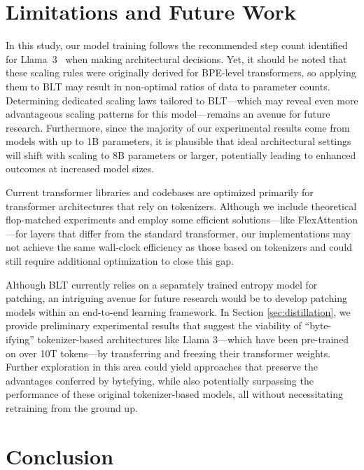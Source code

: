 \section{Limitations and Future Work}

In this study, our model training follows the recommended step count identified for Llama~3~\citep{dubey2024llama} when making architectural decisions. Yet, it should be noted that these scaling rules were originally derived for BPE-level transformers, so applying them to {\textsc BLT} may result in non-optimal ratios of data to parameter counts. Determining dedicated scaling laws tailored to {\textsc BLT}—which may reveal even more advantageous scaling patterns for this model—remains an avenue for future research. Furthermore, since the majority of our experimental results come from models with up to 1B parameters, it is plausible that ideal architectural settings will shift with scaling to 8B parameters or larger, potentially leading to enhanced outcomes at increased model sizes.

Current transformer libraries and codebases are optimized primarily for transformer architectures that rely on tokenizers. Although we include theoretical flop-matched experiments and employ some efficient solutions—like FlexAttention—for layers that differ from the standard transformer, our implementations may not achieve the same wall-clock efficiency as those based on tokenizers and could still require additional optimization to close this gap.

Although {\textsc BLT} currently relies on a separately trained entropy model for patching, an intriguing avenue for future research would be to develop patching models within an end-to-end learning framework. In Section \ref{sec:distillation}, we provide preliminary experimental results that suggest the viability of “byte-ifying” tokenizer-based architectures like Llama 3—which have been pre-trained on over 10T tokens—by transferring and freezing their transformer weights. Further exploration in this area could yield approaches that preserve the advantages conferred by bytefying, while also potentially surpassing the performance of these original tokenizer-based models, all without necessitating retraining from the ground up.

\section{Conclusion}
\label{section:conclusion}

